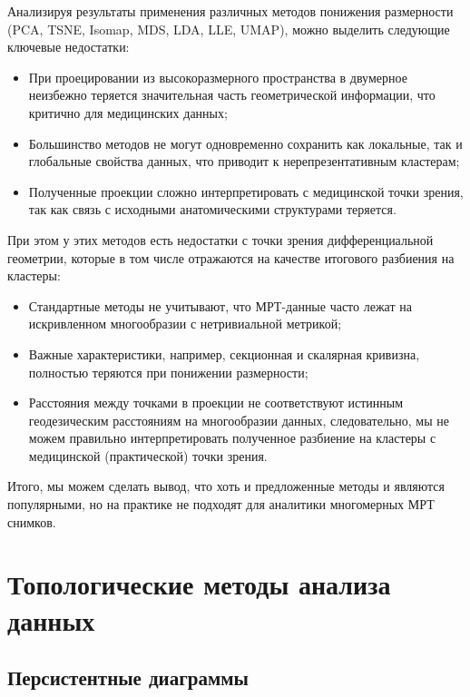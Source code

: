 \documentclass[a4paper,12pt]{extarticle}
\begin{document}
Анализируя результаты применения различных методов понижения размерности (PCA, TSNE, Isomap, MDS, LDA, LLE, UMAP), можно выделить следующие ключевые недостатки:

\begin{itemize}
    \item При проецировании из высокоразмерного пространства в двумерное неизбежно теряется значительная часть геометрической информации, что критично для медицинских данных;
    
    \item Большинство методов не могут одновременно сохранить как локальные, так и глобальные свойства данных, что приводит к нерепрезентативным кластерам;
    
    \item Полученные проекции сложно интерпретировать с медицинской точки зрения, так как связь с исходными анатомическими структурами теряется.
\end{itemize}

При этом у этих методов есть недостатки с точки зрения дифференциальной геометрии, которые в том числе отражаются на качестве итогового разбиения на кластеры:

\begin{itemize}
    \item Стандартные методы не учитывают, что МРТ-данные часто лежат на искривленном многообразии с нетривиальной метрикой;
    
    \item Важные характеристики, например, секционная и скалярная кривизна, полностью теряются при понижении размерности;
    
    \item Расстояния между точками в проекции не соответствуют истинным геодезическим расстояниям на многообразии данных, следовательно, мы не можем правильно интерпретировать полученное разбиение на кластеры с медицинской (практической) точки зрения.
\end{itemize}

Итого, мы можем сделать вывод, что хоть и предложенные методы и являются популярными, но на практике не подходят для аналитики многомерных МРТ снимков. 

\section{Топологические методы анализа данных}

\subsection{Персистентные диаграммы}
\end{document}
